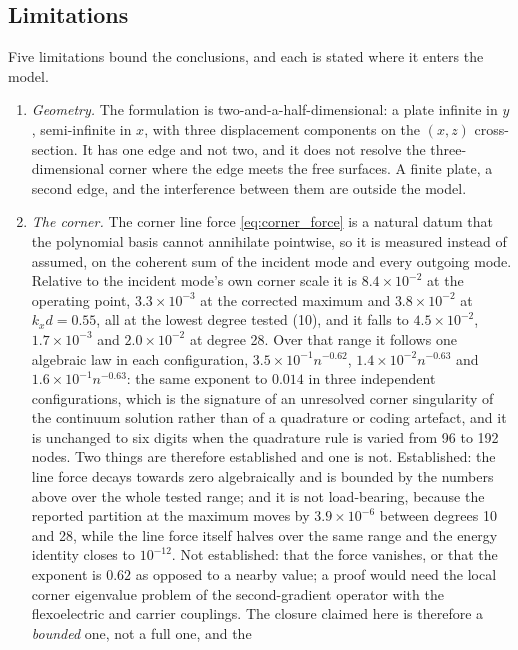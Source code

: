 \subsection{Limitations}
\label{sec:disc_limitations}

Five limitations bound the conclusions, and each is stated where it enters the
model.

\begin{enumerate}
\item \emph{Geometry.}  The formulation is two-and-a-half-dimensional: a plate
infinite in $y$, semi-infinite in $x$, with three displacement components on the
$(x,z)$ cross-section.  It has one edge and not two, and it does not resolve the
three-dimensional corner where the edge meets the free surfaces.  A finite
plate, a second edge, and the interference between them are outside the model.
\item \emph{The corner.}  The corner line force \eqref{eq:corner_force} is a
natural datum that the polynomial basis cannot annihilate pointwise, so it is
measured instead of assumed, on the coherent sum of the incident mode and every
outgoing mode.  Relative to the incident mode's own corner scale it is
$8.4\times10^{-2}$ at the operating point, $3.3\times10^{-3}$ at the corrected
maximum and $3.8\times10^{-2}$ at $k_xd=0.55$, all at the lowest degree tested
(10), and it falls to $4.5\times10^{-2}$, $1.7\times10^{-3}$ and
$2.0\times10^{-2}$ at degree 28.  Over that range it follows one algebraic law in
each configuration, $3.5\times10^{-1}n^{-0.62}$,
$1.4\times10^{-2}n^{-0.63}$ and $1.6\times10^{-1}n^{-0.63}$: the same exponent to
$0.014$ in three independent configurations, which is the signature of an
unresolved corner singularity of the continuum solution rather than of a
quadrature or coding artefact, and it is unchanged to six digits when the
quadrature rule is varied from 96 to 192 nodes.  Two things are therefore
established and one is not.  Established: the line force decays towards zero
algebraically and is bounded by the numbers above over the whole tested range;
and it is not load-bearing, because the reported partition at the maximum moves
by $3.9\times10^{-6}$ between degrees 10 and 28, while the line force itself
halves over the same range and the energy identity closes to $10^{-12}$.  Not
established: that the force vanishes, or that the exponent is $0.62$ as opposed
to a nearby value; a proof would need the local corner eigenvalue problem of the
second-gradient operator with the flexoelectric and carrier couplings.  The
closure claimed here is therefore a \emph{bounded} one, not a full one, and the

\end{enumerate}
